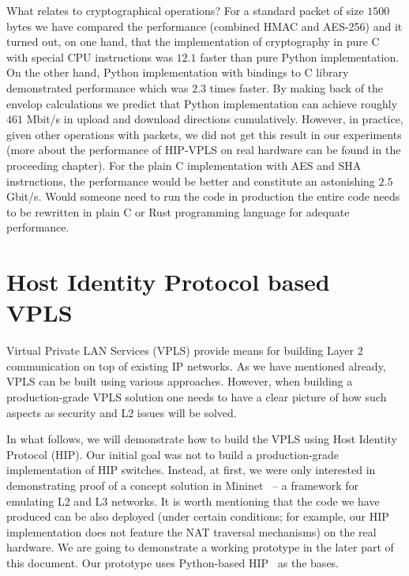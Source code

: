 What relates to cryptographical operations? For a standard packet of size $1500$ 
bytes we have compared the performance (combined HMAC and AES-256) and it turned 
out, on one hand, that the implementation of cryptography in pure C with special CPU instructions was 
$12.1$ faster than pure Python implementation. On the other hand, Python implementation with bindings
to C library demonstrated performance which was $2.3$ times faster. By making back of the envelop calculations
we predict that Python implementation can achieve roughly $461$ Mbit/s in upload and download directions
cumulatively. However, in practice, given other operations with packets, we did not get this result 
in our experiments (more about the performance of HIP-VPLS on real hardware can be found in the proceeding 
chapter). For the plain C implementation with AES and SHA instructions, the performance would be 
better and constitute an astonishing $2.5$ Gbit/s. Would someone need to run the code in production
the entire code needs to be rewritten in plain C or Rust programming language for adequate performance.

\section{Host Identity Protocol based VPLS}

Virtual Private LAN Services (VPLS) provide means for building Layer 2 communication 
on top of existing IP networks. As we have mentioned already, VPLS can be built using various approaches. However, 
when building a production-grade VPLS solution one needs to have a clear picture of 
how such aspects as security and L2 issues will be solved.

In what follows, we will demonstrate how to build the VPLS using Host Identity Protocol (HIP). 
Our initial goal was not to build a production-grade implementation of HIP switches. Instead, 
at first, we were only interested in demonstrating proof of a concept solution in 
Mininet~\cite{mininet} – a framework for emulating L2 and L3 networks. It is worth mentioning that the code 
we have produced can be also deployed (under certain conditions; for example, our HIP implementation 
does not feature the NAT traversal mechanisms) on the real hardware. We are going to demonstrate 
a working prototype in the later part of this document. Our prototype uses Python-based HIP~\cite{pyhip} 
as the bases.

